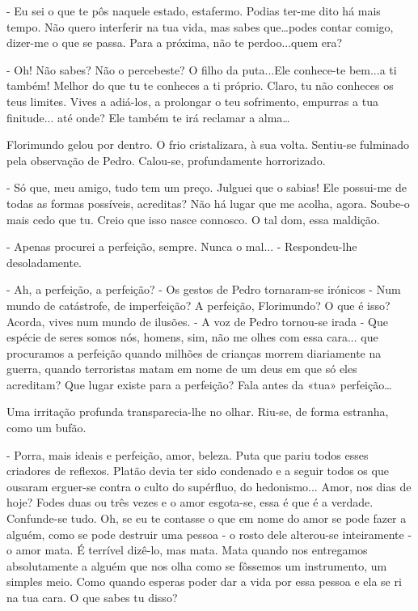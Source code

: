 - Eu sei o que te pôs naquele estado, estafermo. Podias ter-me dito há
mais tempo. Não quero interferir na tua vida, mas sabes que\ldots{}podes
contar comigo, dizer-me o que se passa. Para a próxima, não te
perdoo...quem era?

- Oh! Não sabes? Não o percebeste? O filho da puta...Ele conhece-te
bem...a ti também! Melhor do que tu te conheces a ti próprio. Claro, tu
não conheces os teus limites. Vives a adiá-los, a prolongar o teu
sofrimento, empurras a tua finitude... até onde? Ele também te irá
reclamar a alma\ldots{}

Florimundo gelou por dentro. O frio cristalizara, à sua volta. Sentiu-se
fulminado pela observação de Pedro. Calou-se, profundamente horrorizado.

- Só que, meu amigo, tudo tem um preço. Julguei que o sabias! Ele
possui-me de todas as formas possíveis, acreditas? Não há lugar que me
acolha, agora. Soube-o mais cedo que tu. Creio que isso nasce connosco.
O tal dom, essa maldição.

- Apenas procurei a perfeição, sempre. Nunca o mal... - Respondeu-lhe
desoladamente.

- Ah, a perfeição, a perfeição? - Os gestos de Pedro tornaram-se
irónicos - Num mundo de catástrofe, de imperfeição? A perfeição,
Florimundo? O que é isso? Acorda, vives num mundo de ilusões. - A voz de
Pedro tornou-se irada - Que espécie de seres somos nós, homens, sim, não
me olhes com essa cara... que procuramos a perfeição quando milhões de
crianças morrem diariamente na guerra, quando terroristas matam em nome
de um deus em que só eles acreditam? Que lugar existe para a perfeição?
Fala antes da «tua» perfeição\ldots{}

Uma irritação profunda transparecia-lhe no olhar. Riu-se, de forma
estranha, como um bufão.

- Porra, mais ideais e perfeição, amor, beleza. Puta que pariu todos
esses criadores de reflexos. Platão devia ter sido condenado e a seguir
todos os que ousaram erguer-se contra o culto do supérfluo, do
hedonismo... Amor, nos dias de hoje? Fodes duas ou três vezes e o amor
esgota-se, essa é que é a verdade. Confunde-se tudo. Oh, se eu te
contasse o que em nome do amor se pode fazer a alguém, como se pode
destruir uma pessoa - o rosto dele alterou-se inteiramente - o amor
mata. É terrível dizê-lo, mas mata. Mata quando nos entregamos
absolutamente a alguém que nos olha como se fôssemos um instrumento, um
simples meio. Como quando esperas poder dar a vida por essa pessoa e ela
se ri na tua cara. O que sabes tu disso?

